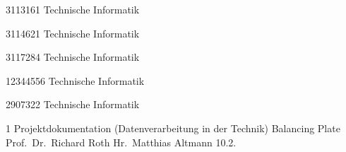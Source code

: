 \documentclass[12pt,a4paper,bibliography=totoc,listof=totoc]{scrartcl}
\begin{document}
{3113161}						%
{Technische Informatik}			%

{3114621}						%
{Technische Informatik}			%

{3117284}						%
{Technische Informatik}			%

{12344556}						%
{Technische Informatik}			%

{2907322}						%
{Technische Informatik}			%


\MyTitelseite{}
{1}								%
{Projektdokumentation (Datenverarbeitung in der Technik)}			%
{Balancing Plate}				%
{Prof.\ Dr.\ Richard Roth}   %
{Hr.\ Matthias Altmann}	%
{10.2.\the\year}				%

\setcounter{page}{1} 




\tableofcontents
\pagebreak
\end{document}
